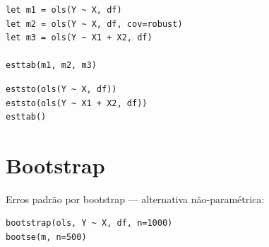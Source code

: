 \begin{lstlisting}[caption={Comparação de especificações}]
let m1 = ols(Y ~ X, df)
let m2 = ols(Y ~ X, df, cov=robust)
let m3 = ols(Y ~ X1 + X2, df)

esttab(m1, m2, m3)
\end{lstlisting}

\begin{lstlisting}
eststo(ols(Y ~ X, df))
eststo(ols(Y ~ X1 + X2, df))
esttab()
\end{lstlisting}

\section{Bootstrap}

Erros padrão por bootstrap — alternativa não-paramétrica:

\begin{lstlisting}
bootstrap(ols, Y ~ X, df, n=1000)
bootse(m, n=500)
\end{lstlisting}
